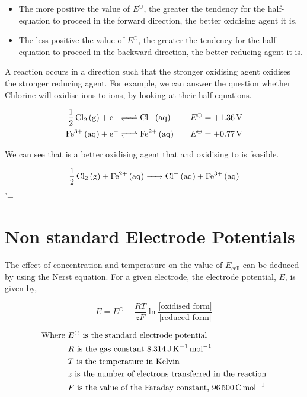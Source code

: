 \documentclass{scrbook}
\begin{document}
	\begin{itemize}
		\item
			The more positive the value of $E^\ominus$, the greater the tendency for the half-equation to proceed in the forward direction, the better oxidising agent it is.
		\item
			The less positive the value of $E^\ominus$, the greater the tendency for the half-equation to proceed in the backward direction, the better reducing agent it is.
	\end{itemize}

	A reaction occurs in a direction such that the stronger oxidising agent oxidises the stronger reducing agent. For example, we can answer the question whether Chlorine will oxidise  ions to  ions, by looking at their half-equations.

	\begin{align*}
		\ce{ 1/2Cl2 (g) + e- &<=> Cl- (aq)} && &E^\ominus &= \SI[explicit-sign=+]{1.36}{\volt} \\
		\ce{ Fe^{3+} (aq) + e- &<=> Fe^{2+} (aq) } && &E^\ominus &= \SI[explicit-sign=+]{0.77}{\volt}
	\end{align*}

	We can see that  is a better oxidising agent that  and  oxidising  to  is feasible.

	\[ \ce{1/2Cl2 (g) + Fe^{2+} (aq) -> Cl- (aq) + Fe^{3+} (aq) } \]'=

\section{Non standard Electrode Potentials}

	The effect of concentration and temperature on the value of $E_{\text{cell}}$ can be deduced by using the Nerst equation. For a given electrode, the electrode potential, $E$, is given by,

	\[ E = E^\ominus + \frac{RT}{zF}\ln{\frac{\text{[oxidised form]}}{\text{[reduced form]}}} \]

	\begin{align*}
		\text{Where } 
		& E^\ominus \text{ is the standard electrode potential} \\
		& R \text{ is the gas constant \SI{8.314}{\joule\per\kelvin\per\mole}} \\
		& T \text{ is the temperature in Kelvin} \\
		& z \text{ is the number of electrons transferred in the reaction} \\
		& F \text{ is the value of the Faraday constant, \SI{96500}{\coulomb\per\mole}}
	\end{align*}
\end{document}
